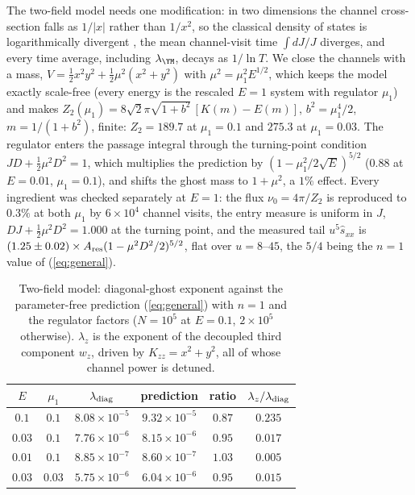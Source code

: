 The two-field model needs one modification: in two dimensions the channel cross-section falls as
$1/|x|$ rather than $1/x^2$, so the classical density of states is logarithmically divergent
\cite{Simon83}, the mean channel-visit time $\int dJ/J$ diverges, and every time average,
including $\lambda_\YM$, decays as $1/\ln T$. We close the channels with a mass,
$V=\tfrac12x^2y^2+\tfrac12\mu^2(x^2+y^2)$ with $\mu^2=\mu_1^2E^{1/2}$, which keeps the model
exactly scale-free (every energy is the rescaled $E=1$ system with regulator $\mu_1$) and makes
$Z_2(\mu_1)=8\sqrt2\pi\sqrt{1+b^2}\,[K(m)-E(m)]$, $b^2=\mu_1^4/2$, $m=1/(1+b^2)$, finite:
$Z_2=189.7$ at $\mu_1=0.1$ and $275.3$ at $\mu_1=0.03$. The regulator enters the passage
integral through the turning-point condition $JD+\tfrac12\mu^2D^2=1$, which multiplies the
prediction by $(1-\mu_1^2/2\sqrt E)^{5/2}$ ($0.88$ at $E=0.01$, $\mu_1=0.1$), and shifts the
ghost mass to $1+\mu^2$, a $1\%$ effect. Every ingredient was checked separately at $E=1$: the
flux $\nu_0=4\pi/Z_2$ is reproduced to $0.3\%$ at both $\mu_1$ by $6\times10^4$ channel visits,
the entry measure is uniform in $J$, $DJ+\tfrac12\mu^2D^2=1.000$ at the turning point, and the
measured tail $u^5\hat s_{xx}$ is $(1.25\pm0.02)\times A_{\rm res}(1-\mu^2D^2/2)^{5/2}$, flat
over $u=8$--$45$, the $5/4$ being the $n=1$ value of (\ref{eq:general}).

\begin{table}
\centering
\caption{Two-field model: diagonal-ghost exponent against the parameter-free prediction
(\ref{eq:general}) with $n=1$ and the regulator factors ($N=10^5$ at $E=0.1$, $2\times10^5$
otherwise). $\lambda_z$ is the exponent of the decoupled third component $w_z$, driven by
$K_{zz}=x^2+y^2$, all of whose channel power is detuned.}
\label{tab:twofield}
\begin{tabular}{cccccc}
\toprule
$E$ & $\mu_1$ & $\lambda_{\rm diag}$ & prediction & ratio & $\lambda_z/\lambda_{\rm diag}$\\
\midrule
$0.1$  & $0.1$  & $8.08\times10^{-5}$ & $9.32\times10^{-5}$ & $0.87$ & $0.235$\\
$0.03$ & $0.1$  & $7.76\times10^{-6}$ & $8.15\times10^{-6}$ & $0.95$ & $0.017$\\
$0.01$ & $0.1$  & $8.85\times10^{-7}$ & $8.60\times10^{-7}$ & $1.03$ & $0.005$\\
$0.03$ & $0.03$ & $5.75\times10^{-6}$ & $6.04\times10^{-6}$ & $0.95$ & $0.015$\\
\bottomrule
\end{tabular}
\end{table}

